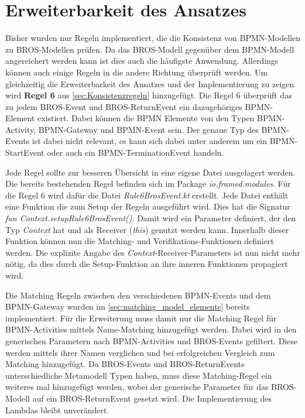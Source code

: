 \section{Erweiterbarkeit des Ansatzes}

Bisher wurden nur Regeln implementiert, die die Konsistenz von BPMN-Modellen zu BROS-Modellen prüfen.
Da das BROS-Modell gegenüber dem BPMN-Modell angereichert werden kann ist dies auch die häufigste Anwendung.
Allerdings können auch einige Regeln in die andere Richtung überprüft werden.
Um gleichzeitig die Erweiterbarkeit des Ansatzes und der Implementierung zu zeigen wird \textbf{Regel 6} aus \cref{sec:Konsistenzregeln} hinzugefügt.
Die Regel 6 überprüft das zu jedem BROS-Event und BROS-ReturnEvent ein dazugehöriges BPMN-Element existiert. 
Dabei können die BPMN Elemente von den Typen BPMN-Activity, BPMN-Gateway und BPMN-Event sein. 
Der genaue Typ des BPMN-Events ist dabei nicht relevant, es kann sich dabei unter anderem um ein BPMN-StartEvent oder auch ein BPMN-TerminationEvent handeln.

Jede Regel sollte zur besseren Übersicht in eine eigene Datei ausgelagert werden.
Die bereits bestehenden Regel befinden sich im Package \emph{io.framed.modules}.
Für die Regel 6 wird dafür die Datei \emph{Rule6BrosEvent.kt} erstellt.
Jede Datei enthält eine Funktion die zum Setup der Regeln ausgeführt wird.
Dies hat die Signatur \emph{fun Context.setupRule6BrosEvent()}.
Damit wird ein Parameter definiert, der den Typ \emph{Context} hat und als Receiver (\emph{this}) genutzt werden kann.
Innerhalb dieser Funktion können nun die Matching- und Verifikations-Funktionen definiert werden.
Die explizite Angabe des \emph{Context}-Receiver-Parameters ist nun nicht mehr nötig, da dies durch die Setup-Funktion an ihre inneren Funktionen propagiert wird. 

Die Matching Regeln zwischen den verschiedenen BPMN-Events und dem BPMN-Gateway wurden im \cref{sec:matching_model_elements} bereits implementiert.
Für die Erweiterung muss damit nur die Matching Regel für BPMN-Activities mittels Name-Matching hinzugefügt werden.
Dabei wird in den generischen Parametern nach BPMN-Activities und BROS-Events gefiltert.
Diese werden mittels ihrer Namen verglichen und bei erfolgreichen Vergleich zum Matching hinzugefügt.
Da BROS-Events und BROS-ReturnEvents unterschiedliche Metamodell Typen haben, muss diese Matching-Regel ein weiteres mal hinzugefügt werden, wobei der generische Parameter für das BROS-Modell auf ein BROS-ReturnEvent gesetzt wird.
Die Implementierung des Lambdas bleibt unverändert.

